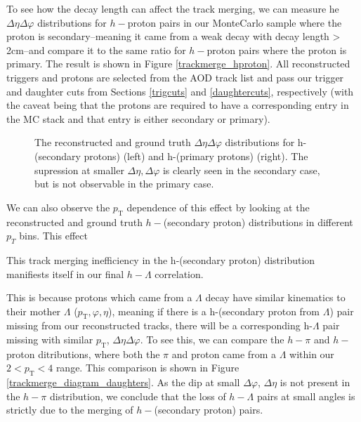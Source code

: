 \documentclass[ALICE,manyauthors]{ALICE_analysis_notes}
\begin{document}
To see how the decay length can affect the track merging, we can measure he $\Delta\eta\Delta\varphi$ distributions for $h-$proton pairs in our MonteCarlo sample where the proton is secondary--meaning it came from a weak decay with decay length > 2cm--and compare it to the same ratio for $h-$proton pairs where the proton is primary. The result is shown in Figure \ref{trackmerge_hproton}. All reconstructed triggers and protons are selected from the AOD track list and pass our trigger and daughter cuts from Sections \ref{trigcuts} and \ref{daughtercuts}, respectively (with the caveat being that the protons are required to have a corresponding entry in the MC stack and that entry is either secondary or primary).

\begin{figure}[ht]
\centering
\begin{subfigure}{
\texttt{[image: figures/track\_merging\_hproton\_secondary.pdf]}}
\end{subfigure}
\begin{subfigure}{
\texttt{[image: figures/track\_merging\_hproton\_primary.pdf]}}
\end{subfigure}
\caption{The  reconstructed and ground truth $\Delta\eta\Delta\varphi$ distributions for h-(secondary protons) (left) and h-(primary protons) (right). The supression at smaller $\Delta\eta, \Delta\varphi$ is clearly seen in the secondary case, but is not observable in the primary case.}
\label{trackmerge_diagram_primary_secondary}
\end{figure}

We can also observe the $p_\text{T}$ dependence of this effect by looking at the reconstructed and ground truth $h-$(secondary proton) distributions in different $p_{T}$ bins. This effect 







This track merging inefficiency in the h-(secondary proton) distribution manifiests itself in our final $h-\Lambda$ correlation. 


This is because protons which came from a $\Lambda$ decay have similar kinematics to their mother $\Lambda$ ($p_\text{T}, \varphi, \eta$), meaning if there is a h-(secondary proton from $\Lambda$) pair missing from our reconstructed tracks, there will be a corresponding h-$\Lambda$ pair missing with similar $p_\text{T}$, $\Delta\eta\Delta\varphi$. To see this, we can compare the $h-\pi$ and $h-$proton ditributions, where both the $\pi$ and proton came from a $\Lambda$ within our $2 < p_\text{T} < 4$ range. This comparison is shown in Figure \ref{trackmerge_diagram_daughters}. As the dip at small $\Delta\varphi$, $\Delta\eta$ is not present in the $h-\pi$ distribution, we conclude that the loss of $h-\Lambda$ pairs at small angles is strictly due to the merging of $h-$(secondary proton) pairs.
\end{document}
